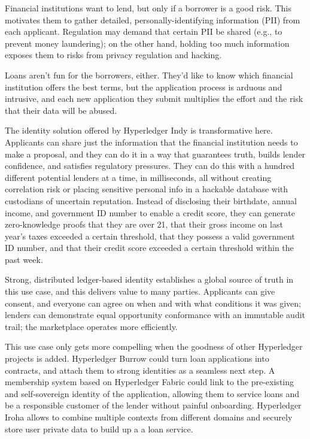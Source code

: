Financial institutions want to lend, but only if a borrower is a good risk. This motivates them to gather detailed, personally-identifying information (PII) from each applicant. Regulation may demand that certain PII be shared (e.g., to prevent money laundering); on the other hand, holding too much information exposes them to risks from privacy regulation and hacking.

Loans aren't fun for the borrowers, either. They'd like to know which financial institution offers the best terms, but the application process is arduous and intrusive, and each new application they submit multiplies the effort and the risk that their data will be abused.

The identity solution offered by Hyperledger Indy is transformative here. Applicants can share just the information that the financial institution needs to make a proposal, and they can do it in a way that guarantees truth, builds lender confidence, and satisfies regulatory pressures. They can do this with a hundred different potential lenders at a time, in milliseconds, all without creating correlation risk or placing sensitive personal info in a hackable database with custodians of uncertain reputation. Instead of disclosing their birthdate, annual income, and government ID number to enable a credit score, they can generate zero-knowledge proofs that they are over 21, that their gross income on last year’s taxes exceeded a certain threshold, that they possess a valid government ID number, and that their credit score exceeded a certain threshold within the past week.

Strong, distributed ledger-based identity establishes a global source of truth in this use case, and this delivers value to many parties. Applicants can give consent, and everyone can agree on when and with what conditions it was given; lenders can demonstrate equal opportunity conformance with an immutable audit trail; the marketplace operates more efficiently.

This use case only gets more compelling when the goodness of other Hyperledger projects is added. Hyperledger Burrow could turn loan applications into contracts, and attach them to strong identities as a seamless next step. A membership system based on Hyperledger Fabric could link to the pre-existing and self-sovereign identity of the application, allowing them to service loans and be a responsible customer of the lender without painful onboarding.
Hyperledger Iroha allows to combine multiple contexts from different domains and securely store user private data to build up a a loan service. 
